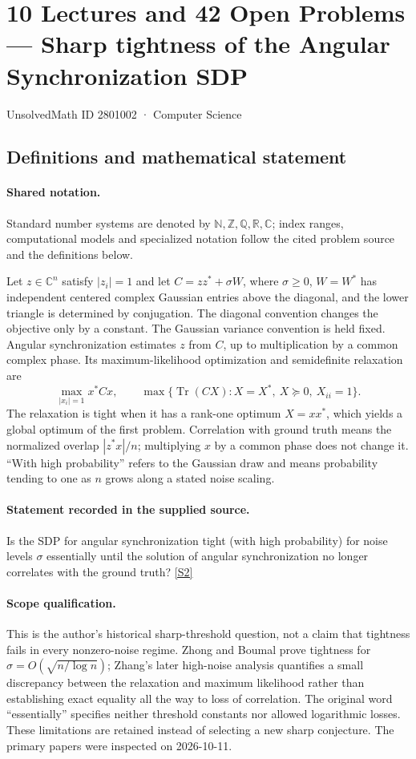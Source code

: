 \documentclass[11pt]{article}
\newcommand{\sref}[2]{\hyperlink{source:#1:#2}{[S#2]}}
\begin{document}
\setcounter{section}{2801001}
\section{10 Lectures and 42 Open Problems — Sharp tightness of the Angular Synchronization SDP}\label{2801002}
{\small\sffamily UnsolvedMath ID 2801002 · Computer Science}
\subsection{Definitions and mathematical statement}

\paragraph{Shared notation.}Standard number systems are denoted by $\mathbb N,\mathbb Z,\mathbb Q,\mathbb R,\mathbb C$; index ranges, computational models and specialized notation follow the cited problem source and the definitions below.


Let $z\in\mathbb{C}^n$ satisfy $|z_i|=1$ and let $C=zz^*+\sigma W$, where $\sigma\ge0$, $W=W^*$ has independent centered complex Gaussian entries above the diagonal, and the lower triangle is determined by conjugation. The diagonal convention changes the objective only by a constant. The Gaussian variance convention is held fixed. Angular synchronization estimates $z$ from $C$, up to multiplication by a common complex phase. Its maximum-likelihood optimization and semidefinite relaxation are
\[
 \max_{|x_i|=1} x^*Cx,\qquad
 \max\{\operatorname{Tr}(CX):X=X^*,\ X\succeq0,\ X_{ii}=1\}.
\]
The relaxation is tight when it has a rank-one optimum $X=xx^*$, which yields a global optimum of the first problem. Correlation with ground truth means the normalized overlap $|z^*x|/n$; multiplying $x$ by a common phase does not change it. ``With high probability'' refers to the Gaussian draw and means probability tending to one as $n$ grows along a stated noise scaling.
\paragraph{Statement recorded in the supplied source.}
Is the SDP for angular synchronization tight (with high probability) for noise levels $\sigma$ essentially until the solution of angular synchronization no longer correlates with the ground truth? \sref{2801002}{2}
\paragraph{Scope qualification.}
This is the author's historical sharp-threshold question, not a claim that tightness fails in every nonzero-noise regime. Zhong and Boumal prove tightness for $\sigma=O(\sqrt{n/\log n})$; Zhang's later high-noise analysis quantifies a small discrepancy between the relaxation and maximum likelihood rather than establishing exact equality all the way to loss of correlation. The original word ``essentially'' specifies neither threshold constants nor allowed logarithmic losses. These limitations are retained instead of selecting a new sharp conjecture. The primary papers were inspected on 2026-10-11.
\end{document}
